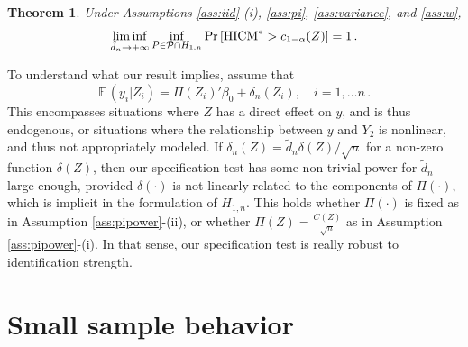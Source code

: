 \documentclass[12pt]{article}
\newcommand{\E}{\operatorname{E}}
\newcommand{\1}{\mathbf{1}}
\newcommand{\HICM}{\operatorname{HICM}}
\def\E{\mathbb{E}\,}
\newcounter{thm}[section]
\newtheorem{theor}[thm]{Theorem}
\begin{document}
\begin{theor}
Under  Assumptions \ref{ass:iid}-(i),  \ref{ass:pi},
\ref{ass:variance}, and  \ref{ass:w},
\[
\liminf_{\tilde{d}_n \rightarrow +\infty} \inf_{P \in {\cal P} \cap H_{1,n}}
\Pr\left[ \HICM^* > c_{1-\alpha} (Z) \right]  = 1
\, .
\]
\label{th:powerspec}
\end{theor}
To understand what our result implies, assume that
\[
\E( y_i | Z_i) = \Pi(Z_i)'\beta_0 + \delta_n(Z_i), \quad i = 1, \ldots n
\, .
\]
This encompasses situations where $Z$ has a direct effect on $y$, and
is thus endogenous, or situations where the relationship between $y$
and $Y_2$ is nonlinear, and thus not appropriately modeled.  If
$\delta_n(Z) = \tilde{d}_n \delta(Z)/\sqrt{n}$ for a non-zero function
$\delta(Z)$, then our specification test has some non-trivial power
for $\tilde{d}_n$ large enough, provided $\delta(\cdot)$ is not
linearly related to the components of $\Pi(\cdot)$, which is implicit
in the formulation of $H_{1,n}$.  This holds whether $\Pi(\cdot)$ is
fixed as in Assumption \ref{ass:pipower}-(ii),  or whether $\Pi(Z) =
\frac{C(Z)}{\sqrt{n}}$  as in Assumption \ref{ass:pipower}-(i).  In that sense, our
specification test is really robust to identification strength.


\section{Small sample behavior}\label{sec.simulation}
\end{document}
